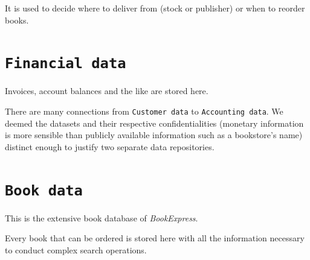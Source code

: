 It is used to decide where to deliver from (stock or publisher) or when to reorder books.


\section{\texttt{Financial data}}
Invoices, account balances and the like are stored here.

There are many connections from \texttt{Customer data} to \texttt{Accounting data}. We deemed the datasets and their respective confidentialities (monetary
information is more sensible than publicly available information such as a bookstore's name) distinct enough to justify two separate data repositories.


\section{\texttt{Book data}}
This is the extensive book database of \emph{BookExpress}.

Every book that can be ordered is stored here with all the information necessary to conduct complex search operations.
\newpage
\printglossaries

